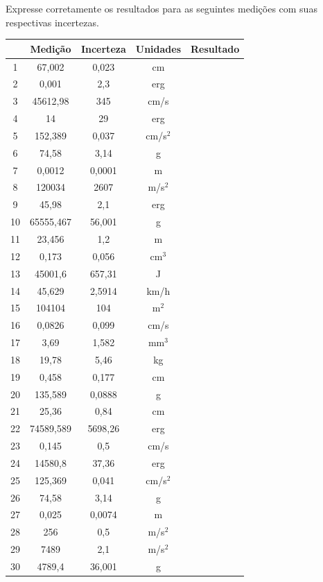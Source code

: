Expresse corretamente os resultados para as seguintes medições com suas respectivas incertezas.
\begin{center}
\vspace{-1cm}
  \begin{tabular}{|c | c | c | c |>{ \centering\arraybackslash}m{8cm} |}  \hline
    & Medição	& Incerteza	& Unidades	& Resultado \\ \hline	 	
    1 & 67,002 & 0,023 & cm & \\ \hline
2 & 0,001 & 2,3 & erg & \\ \hline
3 & 45612,98 & 345 & cm/s & \\ \hline
4 & 14 & 29 & erg & \\ \hline
5 & 152,389 & 0,037 & cm/s$^2$ & \\ \hline
6 & 74,58 & 3,14 & g & \\ \hline
7 & 0,0012 & 0,0001 & m & \\ \hline
8 & 120034 & 2607 & m/s$^2$ & \\ \hline
9 & 45,98 & 2,1 & erg & \\ \hline
10 & 65555,467 & 56,001 & g & \\ \hline
11 & 23,456 & 1,2 & m & \\ \hline
12 & 0,173 & 0,056 & cm$^3$ & \\ \hline
13 & 45001,6 & 657,31 & J & \\ \hline
14 & 45,629 & 2,5914 & km/h & \\ \hline
15 & 104104 & 104 & m$^2$ & \\ \hline
16 & 0,0826 & 0,099 & cm/s & \\ \hline
17 & 3,69 & 1,582 & mm$^3$ & \\ \hline
18 & 19,78 & 5,46 & kg & \\ \hline
19 & 0,458 & 0,177 & cm & \\ \hline
20 & 135,589 & 0,0888 & g & \\ \hline
21 & 25,36 & 0,84 & cm & \\ \hline
22 & 74589,589 & 5698,26 & erg & \\ \hline
23 & 0,145 & 0,5 & cm/s & \\ \hline
24 & 14580,8 & 37,36 & erg & \\ \hline
25 & 125,369 & 0,041 & cm/s$^2$ & \\ \hline
26 & 74,58 & 3,14 & g & \\ \hline
27 & 0,025 & 0,0074 & m & \\ \hline
28 & 256 & 0,5 & m/s$^2$ & \\ \hline
29 & 7489 & 2,1 & m/s$^2$ & \\ \hline
30 & 4789,4 & 36,001 & g & \\ \hline   
  \end{tabular}
\end{center}


